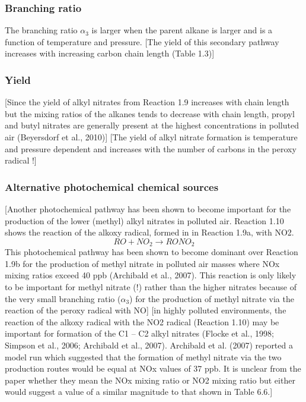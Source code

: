 \documentclass[11pt,a4paper]{article}
\begin{document}
\subsubsection*{Branching ratio}
The branching ratio $\alpha_3$ is larger when the parent alkane is larger and is a function of temperature and pressure.
\citep{Newland2013}
[The yield of this secondary pathway increases with increasing carbon chain length (Table 1.3)]
 
\subsubsection*{Yield}
\citep{Newland2013}
[Since the yield of alkyl nitrates from Reaction 1.9 increases with chain length but the mixing ratios of the alkanes tends to decrease with chain length, propyl and butyl nitrates are generally present at the highest concentrations in polluted air (Beyersdorf et al., 2010)]
\citep{Sommariva2008}
[The yield of alkyl nitrate formation is temperature and pressure dependent and increases with the number of carbons in the peroxy radical \citep{Roberts1990}!]

\subsubsection*{Alternative photochemical chemical sources}
\citep{Newland2013}
[Another photochemical pathway has been shown to become important for the production of the lower (methyl) alkyl nitrates in polluted air. Reaction 1.10 shows the reaction of the alkoxy radical, formed in in Reaction 1.9a, with NO2.
\begin{equation}\label{reac:RO+NO2=RONO2}
RO + NO_2 \rightarrow RONO_2
\end{equation}
This photochemical pathway has been shown to become dominant over Reaction 1.9b for the production of methyl nitrate in polluted air masses where NOx mixing ratios exceed 40 ppb (Archibald et al., 2007). This reaction is only likely to be important for methyl nitrate (!) rather than the higher nitrates because of the very small branching ratio ($\alpha_3$) for the production of methyl nitrate via the reaction of the peroxy radical with NO]
\citep{Newland2013}
[in highly polluted environments, the reaction of the alkoxy radical with the NO2 radical (Reaction 1.10) may be important for formation of the C1 – C2 alkyl nitrates (Flocke et al., 1998; Simpson et al., 2006; Archibald et al., 2007). Archibald et al. (2007) reported a model run which suggested that the formation of methyl nitrate via the two production routes would be equal at NOx values of 37 ppb. It is unclear from the paper whether they mean the NOx mixing ratio or NO2 mixing ratio but either would suggest a value of a similar magnitude to that shown in Table 6.6.]
\end{document}
